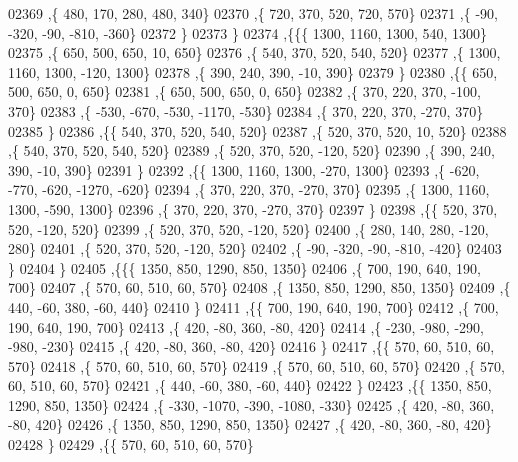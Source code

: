 \begin{DoxyCode}
02369     ,\{   480,   170,   280,   480,   340\}
02370     ,\{   720,   370,   520,   720,   570\}
02371     ,\{   -90,  -320,   -90,  -810,  -360\}
02372     \}
02373    \}
02374   ,\{\{\{  1300,  1160,  1300,   540,  1300\}
02375     ,\{   650,   500,   650,    10,   650\}
02376     ,\{   540,   370,   520,   540,   520\}
02377     ,\{  1300,  1160,  1300,  -120,  1300\}
02378     ,\{   390,   240,   390,   -10,   390\}
02379     \}
02380    ,\{\{   650,   500,   650,     0,   650\}
02381     ,\{   650,   500,   650,     0,   650\}
02382     ,\{   370,   220,   370,  -100,   370\}
02383     ,\{  -530,  -670,  -530, -1170,  -530\}
02384     ,\{   370,   220,   370,  -270,   370\}
02385     \}
02386    ,\{\{   540,   370,   520,   540,   520\}
02387     ,\{   520,   370,   520,    10,   520\}
02388     ,\{   540,   370,   520,   540,   520\}
02389     ,\{   520,   370,   520,  -120,   520\}
02390     ,\{   390,   240,   390,   -10,   390\}
02391     \}
02392    ,\{\{  1300,  1160,  1300,  -270,  1300\}
02393     ,\{  -620,  -770,  -620, -1270,  -620\}
02394     ,\{   370,   220,   370,  -270,   370\}
02395     ,\{  1300,  1160,  1300,  -590,  1300\}
02396     ,\{   370,   220,   370,  -270,   370\}
02397     \}
02398    ,\{\{   520,   370,   520,  -120,   520\}
02399     ,\{   520,   370,   520,  -120,   520\}
02400     ,\{   280,   140,   280,  -120,   280\}
02401     ,\{   520,   370,   520,  -120,   520\}
02402     ,\{   -90,  -320,   -90,  -810,  -420\}
02403     \}
02404    \}
02405   ,\{\{\{  1350,   850,  1290,   850,  1350\}
02406     ,\{   700,   190,   640,   190,   700\}
02407     ,\{   570,    60,   510,    60,   570\}
02408     ,\{  1350,   850,  1290,   850,  1350\}
02409     ,\{   440,   -60,   380,   -60,   440\}
02410     \}
02411    ,\{\{   700,   190,   640,   190,   700\}
02412     ,\{   700,   190,   640,   190,   700\}
02413     ,\{   420,   -80,   360,   -80,   420\}
02414     ,\{  -230,  -980,  -290,  -980,  -230\}
02415     ,\{   420,   -80,   360,   -80,   420\}
02416     \}
02417    ,\{\{   570,    60,   510,    60,   570\}
02418     ,\{   570,    60,   510,    60,   570\}
02419     ,\{   570,    60,   510,    60,   570\}
02420     ,\{   570,    60,   510,    60,   570\}
02421     ,\{   440,   -60,   380,   -60,   440\}
02422     \}
02423    ,\{\{  1350,   850,  1290,   850,  1350\}
02424     ,\{  -330, -1070,  -390, -1080,  -330\}
02425     ,\{   420,   -80,   360,   -80,   420\}
02426     ,\{  1350,   850,  1290,   850,  1350\}
02427     ,\{   420,   -80,   360,   -80,   420\}
02428     \}
02429    ,\{\{   570,    60,   510,    60,   570\}

\end{DoxyCode}
